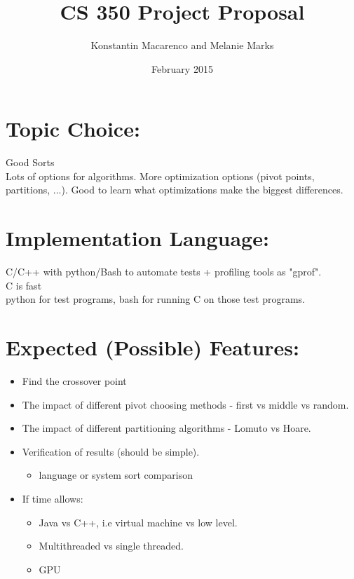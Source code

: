 \documentclass{article}
\title{CS 350 Project Proposal}
\author{Konstantin Macarenco and Melanie Marks }
\date{February 2015}
\begin{document}
\maketitle


%


\noindent
\section*{Topic Choice:}
Good Sorts\\
Lots of options for algorithms.  More optimization options (pivot points, partitions, ...).  Good to learn what optimizations make the biggest differences.\\
\section*{Implementation Language:}
C/C++ with python/Bash to automate tests + profiling tools as "gprof".\\
C is fast\\
python for test programs, bash for running C on those test programs.
\section*{Expected (Possible) Features:} 
\begin{itemize}
\item Find the crossover point
\item The impact of different pivot choosing methods - first vs middle vs random.
\item The impact of different partitioning algorithms - Lomuto vs Hoare.
\item Verification of results (should be simple).
\begin{itemize}
\item language or system sort comparison
\end{itemize}
\item If time allows: 
\begin{itemize}
\item Java vs C++, i.e virtual machine vs low level.
\item Multithreaded vs single threaded.
\item GPU
\end{itemize}
\end{itemize}
\end{document}
